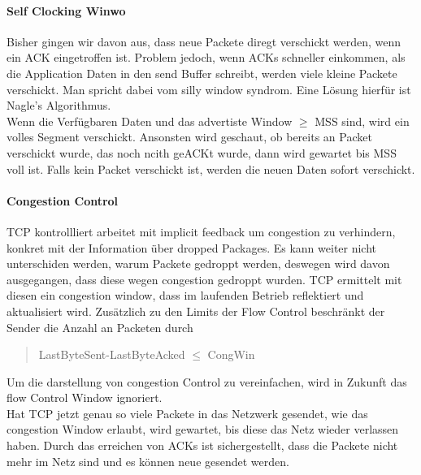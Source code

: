 			\paragraph{Self Clocking Winwo}
				Bisher gingen wir davon aus, dass neue Packete diregt verschickt werden, wenn ein ACK eingetroffen ist. Problem jedoch, wenn ACKs schneller einkommen, als die Application Daten in den send Buffer schreibt, werden viele kleine Packete verschickt. Man spricht dabei vom \frQuo silly window syndrom\frQuc. Eine Lösung hierfür ist Nagle's Algorithmus. \\
				Wenn die Verfügbaren Daten und das advertiste Window $\ge$ MSS sind, wird ein volles Segment verschickt. Ansonsten wird geschaut, ob bereits an Packet verschickt wurde, das noch ncith geACKt wurde, dann wird gewartet bis MSS voll ist. Falls kein Packet verschickt ist, werden die neuen Daten sofort verschickt. 
			
			\paragraph{Congestion Control}
				TCP kontrollliert arbeitet mit implicit feedback um congestion zu verhindern, konkret mit der Information über dropped Packages. Es kann weiter nicht unterschiden werden, warum Packete gedroppt werden, deswegen wird davon ausgegangen, dass diese wegen congestion gedroppt wurden. TCP ermittelt mit diesen ein congestion window, dass im laufenden Betrieb reflektiert und aktualisiert wird. Zusätzlich zu den Limits der Flow Control beschränkt der Sender die Anzahl an Packeten durch 
				\begin{quote}
					LastByteSent-LastByteAcked $\le$ CongWin
				\end{quote}
				Um die darstellung von congestion Control zu vereinfachen, wird in Zukunft das flow Control Window ignoriert. \\
				Hat TCP jetzt genau so viele Packete in das Netzwerk gesendet, wie das congestion Window erlaubt, wird gewartet, bis diese das Netz wieder verlassen haben. Durch das erreichen von ACKs ist sichergestellt, dass die Packete nicht mehr im Netz sind und es können neue gesendet werden. 

